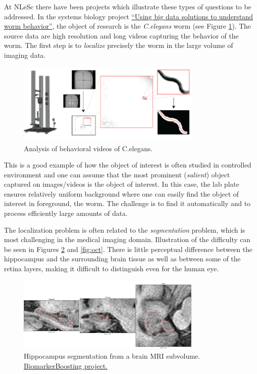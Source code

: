  At NLeSc there have been projects which illustrate these types of questions to be addressed. In the systems biology project \href{https://blog.surf.nl/en/eyr4-blog-5-using-big-data-solutions-to-understand-worm-behavior/}{``Using big data solutions to understand worm behavior''}, the object of research is the {\em C.elegans} worm (see Figure \ref{fig:Celegans}). The source data are high resolution and long videos capturing the behavior of the worm. The first step is to {\em localize} precisely the worm in the large volume of imaging data. 
\begin{figure}[H]
\begin{center}
\includegraphics[width=0.8\textwidth]{fig/Celegans}
\end{center}
\caption{Analysis of behavioral videos of C.elegans.}
\label{fig:Celegans}
\end{figure}
This is a good example of how the object of interest is often studied in controlled environment and one can assume that the most prominent ({\em salient}) object captured on images/videos is the object of interest. In this case, the lab plate ensures relatively uniform background where one can easily find the object of interest in foreground, the worm. The challenge is to find it automatically and to process efficiently large amounts of data.

The localization problem is often related to the {\em segmentation} problem, which is most challenging in the medical imaging domain. Illustration of the difficulty can be seen in Figures \ref{fig:hippo} and \ref{fig:oct}. There is little perceptual difference between the hippocampus and the surrounding brain tissue as well as between some of the retina layers, making it difficult to distinguish even for the human eye.

\begin{figure}[H]
\begin{center}
\includegraphics[width=0.8\textwidth]{fig/hippo}
\end{center}
\caption{Hippocampus segmentation from a brain MRI subvolume. \href{https://www.esciencecenter.nl/project/biomarker-boosting}{BiomarkerBoosting project.}}
\label{fig:hippo}
\end{figure}


